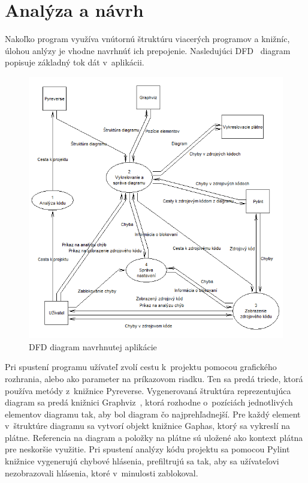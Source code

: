 \documentclass[11pt,oneside,final]{fithesis2}
\begin{document}
	\section{Analýza a návrh}
	
	Nakoľko program využíva vnútornú štruktúru viacerých programov a knižníc, úlohou anlýzy je vhodne navrhnúť ich prepojenie. Nasledujúci DFD~\cite{dfd} diagram popisuje základný tok dát v~aplikácii. 	
	
	\begin{figure}[htb]
	 \centering
	 \includegraphics[width=\textwidth]{images/dfd_main}
	 \caption{DFD diagram navrhnutej aplikácie}
	\end{figure}
	
Pri spustení programu užívateľ zvolí cestu k~projektu pomocou grafického rozhrania, alebo ako parameter na príkazovom riadku. Ten sa predá triede, ktorá používa metódy z~knižnice Pyreverse. Vygenerovaná štruktúra reprezentujúca diagram sa predá knižnici Graphviz~\cite{graphviz}, ktorá rozhodne o~pozíciách jednotlivých elementov diagramu tak, aby bol diagram čo najprehľadnejší. Pre každý element v~štruktúre diagramu sa vytvorí objekt knižnice Gaphas, ktorý sa vykreslí na plátne. Referencia na diagram a položky na plátne sú uložené ako kontext plátna pre neskoršie využitie. Pri spustení analýzy kódu projektu sa pomocou Pylint knižnice vygenerujú chybové hlásenia, prefiltrujú sa tak, aby sa užívateľovi nezobrazovali hlásenia, ktoré v~minulosti zablokoval. 
\end{document}
